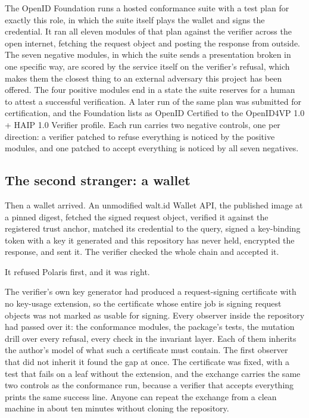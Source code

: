 The OpenID Foundation runs a hosted conformance suite with a test plan for exactly this role, in
which the suite itself plays the wallet and signs the credential. It ran all eleven modules of that
plan against the verifier across the open internet, fetching the request object and posting the
response from outside. The seven negative modules, in which the suite sends a presentation broken in
one specific way, are scored by the service itself on the verifier's refusal, which makes them the
closest thing to an external adversary this project has been offered. The four positive modules end
in a state the suite reserves for a human to attest a successful verification. A later run of the same
plan was submitted for certification, and the Foundation lists  as
OpenID Certified to the OpenID4VP 1.0 + HAIP 1.0 Verifier profile. Each run carries two negative
controls, one per direction: a verifier patched to refuse everything is noticed by the positive
modules, and one patched to accept everything is noticed by all seven negatives. \sWit

\subsection{The second stranger: a wallet}

Then a wallet arrived. An unmodified walt.id Wallet API, the published image at a pinned digest,
fetched the signed request object, verified it against the registered trust anchor, matched its
credential to the query, signed a key-binding token with a key it generated and this repository has
never held, encrypted the response, and sent it. The verifier checked the whole chain and accepted it.

It refused Polaris first, and it was right.

The verifier's own key generator had produced a request-signing certificate with no key-usage
extension, so the certificate whose entire job is signing request objects was not marked as usable
for signing. Every observer inside the repository had passed over it: the conformance modules, the
package's tests, the mutation drill over every refusal, every check in the invariant layer. Each of
them inherits the author's model of what such a certificate must contain. The first observer that did
not inherit it found the gap at once. The certificate was fixed, with a test that fails on a leaf
without the extension, and the exchange carries the same two controls as the conformance run, because a
verifier that accepts everything prints the same success line. Anyone can repeat the exchange from a
clean machine in about ten minutes without cloning the repository. \sWit

